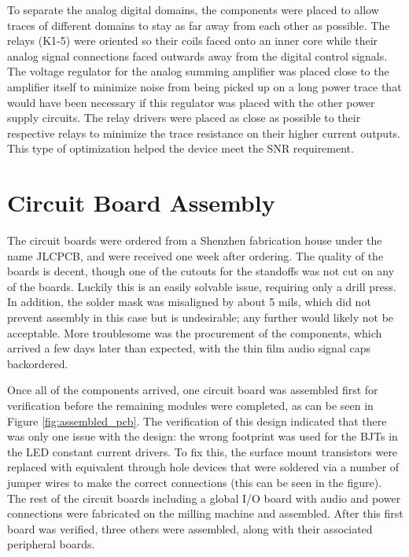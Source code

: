 	To separate the analog digital domains, the components were placed to allow traces of different domains to stay as far away from each other as possible. The relays (K1-5) were oriented so their coils faced onto an inner core while their analog signal connections faced outwards away from the digital control signals. The voltage regulator for the analog summing amplifier was placed close to the amplifier itself to minimize noise from being picked up on a long power trace that would have been necessary if this regulator was placed with the other power supply circuits. The relay drivers were placed as close as possible to their respective relays to minimize the trace resistance on their higher current outputs. This type of optimization helped the device meet the SNR requirement.

\section{Circuit Board Assembly}

	The circuit boards were ordered from a Shenzhen fabrication house under the name JLCPCB, and were received one week after ordering.  The quality of the boards is decent, though one of the cutouts for the standoffs was not cut on any of the boards.  Luckily this is an easily solvable issue, requiring only a drill press.  In addition, the solder mask was misaligned by about 5 mils, which did not prevent assembly in this case but is undesirable; any further would likely not be acceptable.  More troublesome was the procurement of the components, which arrived a few days later than expected, with the thin film audio signal caps backordered.

	Once all of the components arrived, one circuit board was assembled first for verification before the remaining modules were completed, as can be seen in Figure \ref{fig:assembled_pcb}.  The verification of this design indicated that there was only one issue with the design: the wrong footprint was used for the BJTs in the LED constant current drivers.  To fix this, the surface mount transistors were replaced with equivalent through hole devices that were soldered via a number of jumper wires to make the correct connections (this can be seen in the figure).  The rest of the circuit boards including a global I/O board with audio and power connections were fabricated on the milling machine and assembled.  After this first board was verified, three others were assembled, along with their associated peripheral boards.


